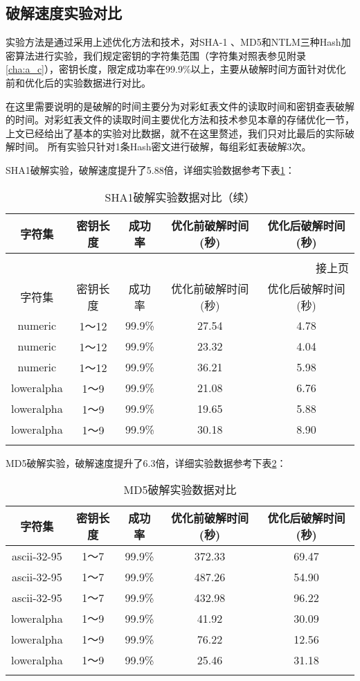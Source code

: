 \subsection{破解速度实验对比}
实验方法是通过采用上述优化方法和技术，对SHA-1 、MD5和NTLM三种Hash加密算法进行实验，我们规定密钥的字符集范围（字符集对照表参见附录\ref{cha:a_c}），密钥长度，限定成功率在99.9\%以上，主要从破解时间方面针对优化前和优化后的实验数据进行对比。

在这里需要说明的是破解的时间主要分为对彩虹表文件的读取时间和密钥查表破解的时间。对彩虹表文件的读取时间主要优化方法和技术参见本章的存储优化一节，上文已经给出了基本的实验对比数据，就不在这里赘述，我们只对比最后的实际破解时间。
所有实验只针对1条Hash密文进行破解，每组彩虹表破解3次。

SHA1破解实验，破解速度提升了5.88倍，详细实验数据参考下表\ref{tab:5.5}：
\begin{longtable}{@{\extracolsep{\fill}}ccccc}
\caption{SHA1破解实验数据对比}\\\toprule[1pt]
\multicolumn{1}{c}{字符集} &
\multicolumn{1}{c}{密钥长度} &
\multicolumn{1}{c}{成功率} &
\multicolumn{1}{c}{优化前破解时间(秒)}&
\multicolumn{1}{c}{优化后破解时间(秒)}\\\midrule
\endfirsthead
\caption[]{SHA1破解实验数据对比（续）}\\
\multicolumn{5}{r}{\footnotesize 接上页}\\
\toprule[1pt]
\multicolumn{1}{c}{字符集} &
\multicolumn{1}{c}{密钥长度} &
\multicolumn{1}{c}{成功率} &
\multicolumn{1}{c}{优化前破解时间(秒)}&
\multicolumn{1}{c}{优化后破解时间(秒)}\\\endhead
numeric & 1～12 & 99.9\% & 27.54 & 4.78 \\
numeric & 1～12 & 99.9\% & 23.32 & 4.04 \\
numeric & 1～12 & 99.9\% & 36.21 & 5.98 \\\hline
loweralpha & 1～9 & 99.9\% & 21.08 & 6.76 \\
loweralpha & 1～9 & 99.9\% & 19.65 & 5.88 \\
loweralpha & 1～9 & 99.9\% & 30.18 & 8.90 \\\hline

\bottomrule[1pt]
\label{tab:5.5}
\end{longtable}
MD5破解实验，破解速度提升了6.3倍，详细实验数据参考下表\ref{tab:5.6}：
\begin{longtable}{@{\extracolsep{\fill}}ccccc}
\caption{MD5破解实验数据对比}\\\toprule[1pt]
\multicolumn{1}{c}{字符集} &
\multicolumn{1}{c}{密钥长度} &
\multicolumn{1}{c}{成功率} &
\multicolumn{1}{c}{优化前破解时间(秒)}&
\multicolumn{1}{c}{优化后破解时间(秒)}\\\midrule
ascii-32-95 & 1～7 & 99.9\% & 372.33 & 69.47 \\
ascii-32-95 & 1～7 & 99.9\% & 487.26 & 54.90 \\
ascii-32-95 & 1～7 & 99.9\% & 432.98 & 96.22 \\\hline
loweralpha & 1～9 & 99.9\% & 41.92 & 30.09 \\
loweralpha & 1～9 & 99.9\% & 76.22 & 12.56 \\
loweralpha & 1～9 & 99.9\% & 25.46 & 31.18 \\
\bottomrule[1pt]
\label{tab:5.6}
\end{longtable}
